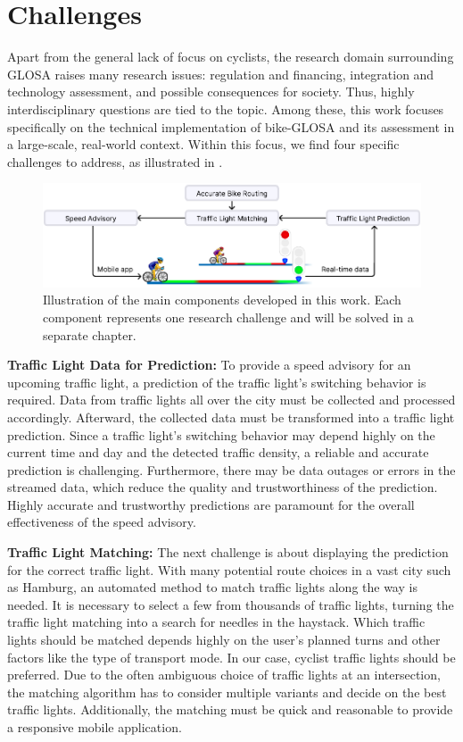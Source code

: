 \section{Challenges}

Apart from the general lack of focus on cyclists, the research domain surrounding GLOSA raises many research issues: regulation and financing, integration and technology assessment, and possible consequences for society. Thus, highly interdisciplinary questions are tied to the topic. Among these, this work focuses specifically on the technical implementation of bike-GLOSA and its assessment in a large-scale, real-world context. Within this focus, we find four specific challenges to address, as illustrated in .

\begin{figure}[t]
\centering
\includegraphics[width=\linewidth]{images/outline.pdf}
\caption{Illustration of the main components developed in this work. Each component represents one research challenge and will be solved in a separate chapter.}
\label{fig:outline}
\end{figure}

\textbf{\color{cidarkblue}Traffic Light Data for Prediction:} To provide a speed advisory for an upcoming traffic light, a prediction of the traffic light's switching behavior is required. Data from traffic lights all over the city must be collected and processed accordingly. Afterward, the collected data must be transformed into a traffic light prediction. Since a traffic light's switching behavior may depend highly on the current time and day and the detected traffic density, a reliable and accurate prediction is challenging. Furthermore, there may be data outages or errors in the streamed data, which reduce the quality and trustworthiness of the prediction. Highly accurate and trustworthy predictions are paramount for the overall effectiveness of the speed advisory.

\textbf{\color{cidarkblue}Traffic Light Matching:} The next challenge is about displaying the prediction for the correct traffic light. With many potential route choices in a vast city such as Hamburg, an automated method to match traffic lights along the way is needed. It is necessary to select a few from thousands of traffic lights, turning the traffic light matching into a search for needles in the haystack. Which traffic lights should be matched depends highly on the user's planned turns and other factors like the type of transport mode. In our case, cyclist traffic lights should be preferred. Due to the often ambiguous choice of traffic lights at an intersection, the matching algorithm has to consider multiple variants and decide on the best traffic lights. Additionally, the matching must be quick and reasonable to provide a responsive mobile application.

